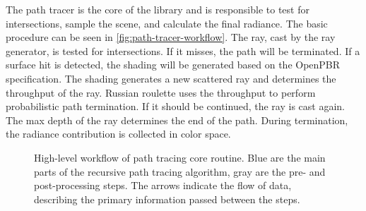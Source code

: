 The path tracer is the core of the library and is responsible to test for intersections, sample the scene, and calculate the final radiance. The basic procedure can be seen in \autoref{fig:path-tracer-workflow}. The ray, cast by the ray generator, is tested for intersections. If it misses, the path will be terminated. If a surface hit is detected, the shading will be generated based on the \gls{OpenPBR} specification. The shading generates a new scattered ray and determines the throughput of the ray. Russian roulette uses the throughput to perform probabilistic path termination. If it should be continued, the ray is cast again. The max depth of the ray determines the end of the path. During termination, the radiance contribution is collected in  color space.

\begin{figure}[H]
    \centering
    \caption{High-level workflow of path tracing core routine. Blue are the main parts of the recursive path tracing algorithm, gray are the pre- and post-processing steps. The arrows indicate the flow of data, describing the primary information passed between the steps.}
    \label{fig:path-tracer-workflow}
\end{figure}


